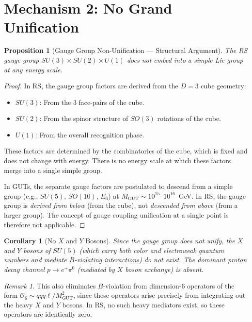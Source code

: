 \documentclass[12pt,a4paper]{article}
\newtheorem{corollary}[theorem]{Corollary}
\newtheorem{proposition}[theorem]{Proposition}
\theoremstyle{definition}
\theoremstyle{remark}
\newtheorem{remark}[theorem]{Remark}
\begin{document}
\section{Mechanism 2: No Grand Unification}
\label{sec:no-gut}

\begin{proposition}[Gauge Group Non-Unification --- Structural Argument]
\label{thm:no-gut}
The RS gauge group $SU(3) \times SU(2) \times U(1)$ does
not embed into a simple Lie group at any energy scale.
\end{proposition}

\begin{proof}
In RS, the gauge group factors are derived from the
$D = 3$ cube geometry:
\begin{itemize}
  \item $SU(3)$: From the 3 face-pairs of the cube.
  \item $SU(2)$: From the spinor structure of $SO(3)$
  rotations of the cube.
  \item $U(1)$: From the overall recognition phase.
\end{itemize}
These factors are determined by the combinatorics of the
cube, which is fixed and does not change with energy.  There
is no energy scale at which these factors merge into a
single simple group.

In GUTs, the separate gauge factors are postulated to
descend from a simple group (e.g., $SU(5)$, $SO(10)$,
$E_6$) at $M_{\mathrm{GUT}} \sim 10^{15}$--$10^{16}$~GeV.
In RS, the gauge group is \emph{derived from below} (from
the cube), not \emph{descended from above} (from a larger
group).  The concept of gauge coupling unification at a
single point is therefore not applicable.
\end{proof}

\begin{corollary}[No $X$ and $Y$ Bosons]
\label{cor:no-xy}
Since the gauge group does not unify, the $X$ and $Y$
bosons of $SU(5)$ (which carry both color and electroweak
quantum numbers and mediate $B$-violating interactions) do
not exist.  The dominant proton decay channel
$p \to e^+\pi^0$ (mediated by $X$ boson exchange) is
absent.
\end{corollary}

\begin{remark}
This also eliminates $B$-violation from dimension-6
operators of the form
$\mathcal{O}_6 \sim qqq\ell / M_{\mathrm{GUT}}^2$,
since these operators arise precisely from integrating out
the heavy $X$ and $Y$ bosons.  In RS, no such heavy
mediators exist, so these operators are identically zero.
\end{remark}
\end{document}
